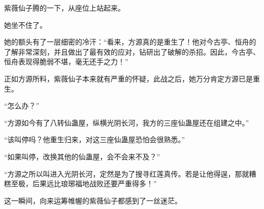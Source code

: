 \begin{this_body}
紫薇仙子腾的一下，从座位上站起来。

她坐不住了。

她的额头有了一层细密的冷汗：“看来，方源真的是重生了！他对今古亭、恒舟的了解非常深刻，并且做出了最有效的应对，钻研出了破解的杀招。因此，今古亭、恒舟表现得脆弱不堪，毫无还手之力！”

正如方源所料，紫薇仙子本来就有严重的怀疑，此战之后，她万分肯定方源已是重生。

“怎么办？”

“方源如今有了八转仙蛊屋，纵横光阴长河，我方的三座仙蛊屋还在组建之中。”

“该叫停吗？他重生归来，对这三座仙蛊屋恐怕会很熟悉。”

“如果叫停，改换其他的仙蛊屋，会不会来不及？”

“方源之所以叫进入光阴长河，定然是为了搜寻红莲真传。若是让他得逞，那就糟糕至极，后果远比琅琊福地战败还要严重得多！”

这一瞬间，向来运筹帷幄的紫薇仙子都感到了一丝迷茫。

\end{this_body}

